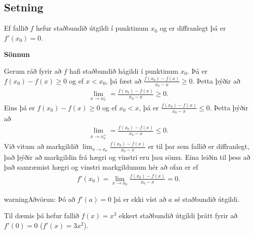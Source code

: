 \documentclass[b5paper,11pt,icelandic]{sphinxmanual}
\begin{document}
\subsection{Setning}
\label{kafli03:setning-3-5-2}\label{kafli03:id11}
Ef fallið \(f\) hefur staðbundið útgildi í punktinum \(x_0\) og
er diffranlegt þá er \(f'(x_0)=0\).

\begin{DUlineblock}{0em}
\item[] 
\end{DUlineblock}

\textbf{Sönnun}

Gerum ráð fyrir að \(f\) hafi staðbundið hágildi í punktinum \(x_0\).
Þá er \(f(x_0)-f(x)\geq 0\) og ef \(x<x_0\),
þá fæst að  \(\frac{f(x_0)-f(x)}{x_0-x}\geq 0\). Þetta þýðir að
\begin{equation*}
\begin{split}\lim_{x \to x_0^-} = \frac{f(x_0) - f(x)}{x_0-x} \geq 0.
    \label{vinstri}\end{split}
\end{equation*}
Eins þá er \(f(x_0)-f(x)\geq 0\) og ef \(x_0<x\),
þá er \(\frac{f(x_0)-f(x)}{x_0-x} \leq 0\).
Þetta þýðir að
\begin{equation*}
\begin{split}\lim_{x \to x_0^+} = \frac{f(x_0) - f(x)}{x_0-x} \leq 0.
    \label{haegri}\end{split}
\end{equation*}
Við vitum að markgildið
\(\lim_{x\to x_0} \frac{f(x_0)-f(x)}{x_0-x}\) er til þar sem fallið
er diffranlegt, það þýðir að markgildin frá hægri og vinstri eru þau
sömu. Eina leiðin til þess að það samræmist hægri og vinstri markgildunum
hér að ofan er ef
\begin{equation*}
\begin{split}f'(x_0) = \lim_{x\to x_0} \frac{f(x_0)-f(x)}{x_0-x} = 0.\end{split}
\end{equation*}
\begin{DUlineblock}{0em}
\item[] 
\item[] 
\end{DUlineblock}

\begin{notice}{warning}{Aðvörun:}
Þó að \(f'(a)=0\) þá er ekki víst að \(a\) sé staðbundið útgildi.

Til dæmis þá hefur fallið \(f(x) = x^3\) ekkert staðbundið útgildi
þrátt fyrir að \(f'(0) = 0\) (\(f'(x) = 3x^2\)).
\end{notice}
\end{document}
